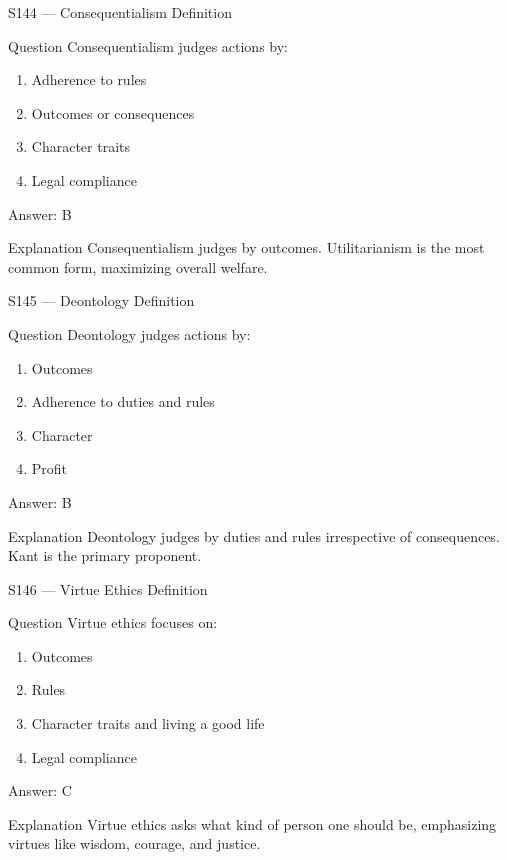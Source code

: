 \documentclass[aspectratio=169,8pt]{beamer}
\begin{document}
	\begin{frame}{S144 --- Consequentialism Definition}
		\begin{block}{Question}
			Consequentialism judges actions by:
			\begin{enumerate}
				\item Adherence to rules
				\item Outcomes or consequences
				\item Character traits
				\item Legal compliance
			\end{enumerate}
		\end{block}
		\begin{exampleblock}{Answer: B}\end{exampleblock}
		\begin{block}{Explanation}
			Consequentialism judges by outcomes. Utilitarianism is the most common form, maximizing overall welfare.
		\end{block}
	\end{frame}
	
	\begin{frame}{S145 --- Deontology Definition}
		\begin{block}{Question}
			Deontology judges actions by:
			\begin{enumerate}
				\item Outcomes
				\item Adherence to duties and rules
				\item Character
				\item Profit
			\end{enumerate}
		\end{block}
		\begin{exampleblock}{Answer: B}\end{exampleblock}
		\begin{block}{Explanation}
			Deontology judges by duties and rules irrespective of consequences. Kant is the primary proponent.
		\end{block}
	\end{frame}
	
	\begin{frame}{S146 --- Virtue Ethics Definition}
		\begin{block}{Question}
			Virtue ethics focuses on:
			\begin{enumerate}
				\item Outcomes
				\item Rules
				\item Character traits and living a good life
				\item Legal compliance
			\end{enumerate}
		\end{block}
		\begin{exampleblock}{Answer: C}\end{exampleblock}
		\begin{block}{Explanation}
			Virtue ethics asks what kind of person one should be, emphasizing virtues like wisdom, courage, and justice.
		\end{block}
	\end{frame}
	
\end{document}
